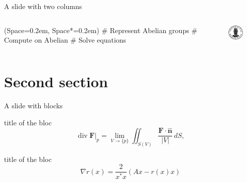 \documentclass[12pt, aspectratio=149]{beamer}
\newcommand{\listSpace}{0.2em}
\theoremstyle{plain}
\begin{document}
\begin{frame}[fragile, t]{A slide with two columns}
\begin{columns}
\begin{column}{0.5\textwidth}
	\begin{easylist}[itemize]
		\ListProperties(Space=\listSpace, Space*=\listSpace)
		# Represent Abelian groups
		# Compute on Abelian
		# Solve equations \footnotemark
	\end{easylist}
\end{column}
\begin{column}{0.5\textwidth}
    \begin{center}
     \includegraphics[width=0.5\textwidth]{figs/UiB_logo.pdf}
     \end{center}
\end{column}
\end{columns}
\end{frame}

\section{Second section}
\begin{frame}[fragile, t]{A slide with blocks}
	\begin{block}{title of the bloc}
	\begin{equation*}
	\left. \operatorname{div} \mathbf{F} \right|_p = \lim_{V \rightarrow \{p\}} \iint_{S(V)} \frac{\mathbf{F}\cdot\mathbf{\hat n}}{|V|} \, dS,
	\end{equation*}
	\end{block}
	
	\begin{exampleblock}{title of the bloc}
	$$\nabla r(x) = \frac{2}{x^* x} ( A x - r(x) x ) $$
	\end{exampleblock}
\end{frame}
\end{document}
